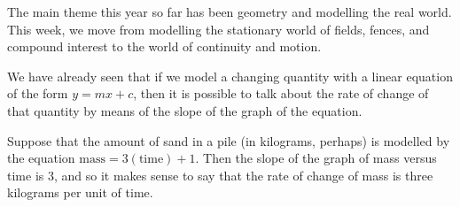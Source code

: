 



The main theme this year so far has been geometry and modelling the real world. This week, we move from modelling the stationary world
of fields, fences, and compound interest to the world of continuity and motion.

We have already seen that if we model a changing quantity with a linear equation of the form $ y = mx + c $, then it is possible to
talk about the rate of change of that quantity by means of the slope of the graph of the equation.

\begin{ex}
  Suppose that the amount of sand in a pile (in kilograms, perhaps) is modelled by the equation $ \text{mass} = 3(\text{time}) + 1 $.
  Then the slope of the graph of mass versus time is 3, and so it makes sense to say that the rate of change of mass is three kilograms
  per unit of time.
\end{ex}

